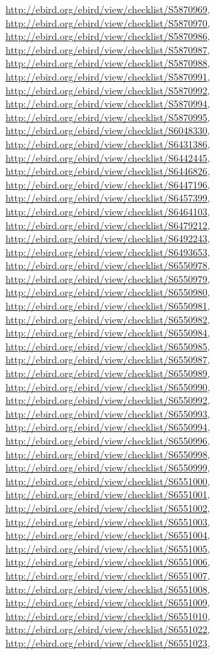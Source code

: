 \documentclass[9pt, article]{memoir}
\begin{document}
\begin{multicols}{2}
\url{http://ebird.org/ebird/view/checklist/S5870969}, 
\url{http://ebird.org/ebird/view/checklist/S5870970}, 
\url{http://ebird.org/ebird/view/checklist/S5870986}, 
\url{http://ebird.org/ebird/view/checklist/S5870987}, 
\url{http://ebird.org/ebird/view/checklist/S5870988}, 
\url{http://ebird.org/ebird/view/checklist/S5870991}, 
\url{http://ebird.org/ebird/view/checklist/S5870992}, 
\url{http://ebird.org/ebird/view/checklist/S5870994}, 
\url{http://ebird.org/ebird/view/checklist/S5870995}, 
\url{http://ebird.org/ebird/view/checklist/S6048330}, 
\url{http://ebird.org/ebird/view/checklist/S6431386}, 
\url{http://ebird.org/ebird/view/checklist/S6442445}, 
\url{http://ebird.org/ebird/view/checklist/S6446826}, 
\url{http://ebird.org/ebird/view/checklist/S6447196}, 
\url{http://ebird.org/ebird/view/checklist/S6457399}, 
\url{http://ebird.org/ebird/view/checklist/S6464103}, 
\url{http://ebird.org/ebird/view/checklist/S6479212}, 
\url{http://ebird.org/ebird/view/checklist/S6492243}, 
\url{http://ebird.org/ebird/view/checklist/S6493653}, 
\url{http://ebird.org/ebird/view/checklist/S6550978}, 
\url{http://ebird.org/ebird/view/checklist/S6550979}, 
\url{http://ebird.org/ebird/view/checklist/S6550980}, 
\url{http://ebird.org/ebird/view/checklist/S6550981}, 
\url{http://ebird.org/ebird/view/checklist/S6550982}, 
\url{http://ebird.org/ebird/view/checklist/S6550984}, 
\url{http://ebird.org/ebird/view/checklist/S6550985}, 
\url{http://ebird.org/ebird/view/checklist/S6550987}, 
\url{http://ebird.org/ebird/view/checklist/S6550989}, 
\url{http://ebird.org/ebird/view/checklist/S6550990}, 
\url{http://ebird.org/ebird/view/checklist/S6550992}, 
\url{http://ebird.org/ebird/view/checklist/S6550993}, 
\url{http://ebird.org/ebird/view/checklist/S6550994}, 
\url{http://ebird.org/ebird/view/checklist/S6550996}, 
\url{http://ebird.org/ebird/view/checklist/S6550998}, 
\url{http://ebird.org/ebird/view/checklist/S6550999}, 
\url{http://ebird.org/ebird/view/checklist/S6551000}, 
\url{http://ebird.org/ebird/view/checklist/S6551001}, 
\url{http://ebird.org/ebird/view/checklist/S6551002}, 
\url{http://ebird.org/ebird/view/checklist/S6551003}, 
\url{http://ebird.org/ebird/view/checklist/S6551004}, 
\url{http://ebird.org/ebird/view/checklist/S6551005}, 
\url{http://ebird.org/ebird/view/checklist/S6551006}, 
\url{http://ebird.org/ebird/view/checklist/S6551007}, 
\url{http://ebird.org/ebird/view/checklist/S6551008}, 
\url{http://ebird.org/ebird/view/checklist/S6551009}, 
\url{http://ebird.org/ebird/view/checklist/S6551010}, 
\url{http://ebird.org/ebird/view/checklist/S6551022}, 
\url{http://ebird.org/ebird/view/checklist/S6551023}, 

\end{multicols}
\end{document}
